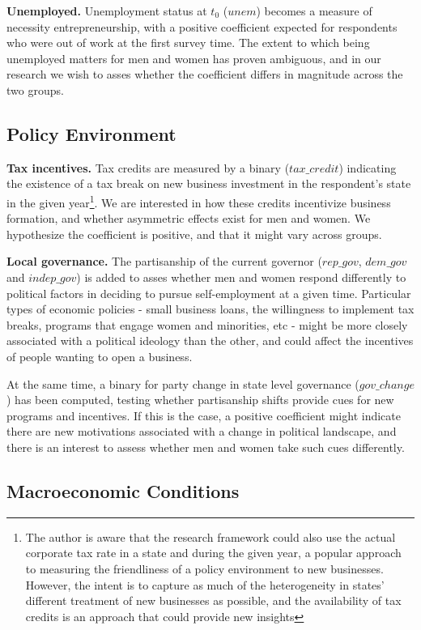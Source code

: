 \textbf{Unemployed.} Unemployment status at $t_0$ ($unem$) becomes a measure of necessity entrepreneurship, with a positive coefficient expected for respondents who were out of work at the first survey time. The extent to which being unemployed matters for men and women has proven ambiguous, and in our research we wish to asses whether the coefficient differs in magnitude across the two groups.


\subsection{Policy Environment}

\textbf{Tax incentives.} Tax credits are measured by a binary ($tax\_credit$) indicating the existence of a tax break on new business investment in the respondent's state in the given year\footnote{The author is aware that the research framework could also use the actual corporate tax rate in a state and during the given year, a popular approach to measuring the friendliness of a policy environment to new businesses. However, the intent is to capture as much of the heterogeneity in states' different treatment of new businesses as possible, and the availability of tax credits is an approach that could provide new insights}. We are interested in how these credits incentivize business formation, and whether asymmetric effects exist for men and women. We hypothesize the coefficient is positive, and that it might vary across groups.

\textbf{Local governance.} The partisanship of the current governor ($rep\_gov$, $dem\_gov$ and $indep\_gov$) is added to asses whether men and women respond differently to political factors in deciding to pursue self-employment at a given time. Particular types of economic policies - small business loans, the willingness to implement tax breaks, programs that engage women and minorities, etc - might be more closely associated with a political ideology than the other, and could affect the incentives of people wanting to open a business. 

At the same time, a binary for party change in state level governance ($gov\_change$) has been computed, testing whether partisanship shifts provide cues for new programs and incentives. If this is the case, a positive coefficient might indicate there are new motivations associated with a change in political landscape, and there is an interest to assess whether men and women take such cues differently. 


\subsection{Macroeconomic Conditions}


